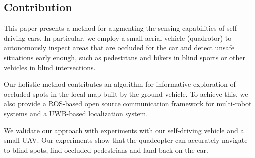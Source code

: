\subsection{Contribution}

This paper presents a method for augmenting the sensing capabilities of self-driving cars.
In particular, we employ a small aerial vehicle (quadrotor) to autonomously inspect areas that are occluded for the car and detect unsafe situations early enough, such as
pedestrians and bikers in blind sports or other vehicles in blind intersections.


Our holistic method contributes an algorithm for informative exploration of occluded spots in the local map built by the ground vehicle. To achieve this, we also provide a ROS-based open source communication framework for multi-robot systems and a UWB-based localization system.

We validate our approach with experiments with our self-driving vehicle and a small UAV. Our experiments show that the quadcopter can accurately navigate to blind spots, find occluded pedestrians and land back on the car.
